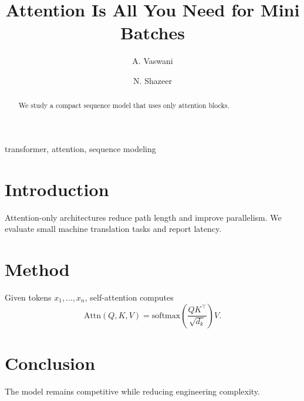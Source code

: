 \documentclass[conference]{IEEEtran}
\title{Attention Is All You Need for Mini Batches}
\author{A. Vaswani \and N. Shazeer}
\begin{document}
\maketitle
\begin{abstract}
We study a compact sequence model that uses only attention blocks.
\end{abstract}
\begin{IEEEkeywords}
transformer, attention, sequence modeling
\end{IEEEkeywords}
\section{Introduction}
Attention-only architectures reduce path length and improve parallelism.
We evaluate small machine translation tasks and report latency.
\section{Method}
Given tokens $x_1,\dots,x_n$, self-attention computes
\begin{equation}
\mathrm{Attn}(Q,K,V)=\mathrm{softmax}\left(\frac{QK^\top}{\sqrt{d_k}}\right)V.
\end{equation}
\section{Conclusion}
The model remains competitive while reducing engineering complexity.


\end{document}

